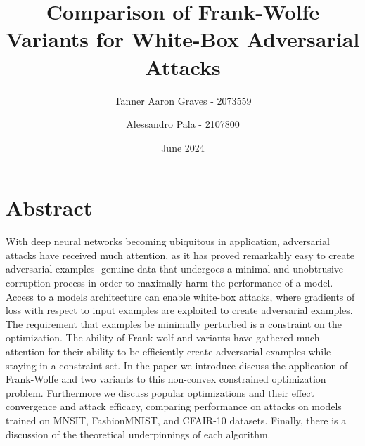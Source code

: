 \documentclass{article}
\title{Comparison of Frank-Wolfe Variants for White-Box Adversarial Attacks}
\author{Tanner Aaron Graves - 2073559\and Alessandro Pala - 2107800}
\date{June 2024}
\begin{document}
\maketitle 
\section{Abstract}
With deep neural networks becoming ubiquitous in application, adversarial attacks have received much attention, as it has proved remarkably easy to create adversarial examples- genuine data that undergoes a minimal and unobtrusive corruption process in order to maximally harm the performance of a model. Access to a models architecture can enable white-box attacks, where gradients of loss with respect to input examples are exploited to create adversarial examples. The requirement that examples be minimally perturbed is a constraint on the optimization. The ability of Frank-wolf and variants have gathered much attention for their ability to be efficiently create adversarial examples while staying in a constraint set. In the paper we introduce discuss the application of Frank-Wolfe and two variants to this non-convex constrained optimization problem. Furthermore we discuss popular optimizations and their effect convergence and attack efficacy, comparing performance on attacks on models trained on MNSIT, FashionMNIST, and CFAIR-10 datasets. Finally, there is a discussion of the theoretical underpinnings of each algorithm. 
\end{document}
